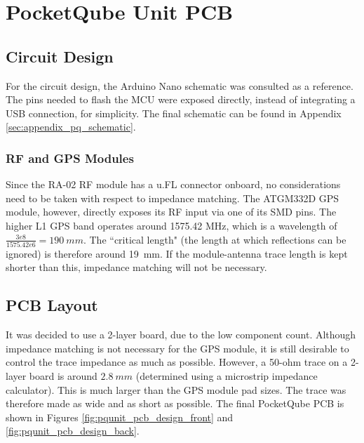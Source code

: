 \section{PocketQube Unit PCB}
\subsection{Circuit Design}
For the circuit design, the Arduino Nano schematic \cite{design-arduinoNano} was consulted as a reference. The pins needed to flash the MCU were exposed directly, instead of integrating a USB connection, for simplicity. The final schematic can be found in Appendix \ref{sec:appendix_pq_schematic}.

\subsubsection{RF and GPS Modules}
Since the RA-02 RF module has a u.FL connector onboard, no considerations need to be taken with respect to impedance matching. The ATGM332D GPS module, however, directly exposes its RF input via one of its SMD pins. The higher L1 GPS band operates around 1575.42 MHz, which is a wavelength of $\frac{3e8}{1575.42e6} = \SI{190}{mm}$. The ``critical length" (the length at which reflections can be ignored) is therefore around \SI{19}{mm}. If the module-antenna trace length is kept shorter than this, impedance matching will not be necessary.

\subsection{PCB Layout}
It was decided to use a 2-layer board, due to the low component count. Although impedance matching is not necessary for the GPS module, it is still desirable to control the trace impedance as much as possible. However, a 50-ohm trace on a 2-layer board is around $\SI{2.8}{mm}$ (determined using a microstrip impedance calculator). This is much larger than the GPS module pad sizes. The trace was therefore made as wide and as short as possible. The final PocketQube PCB is shown in Figures \ref{fig:pqunit_pcb_design_front} and \ref{fig:pqunit_pcb_design_back}.